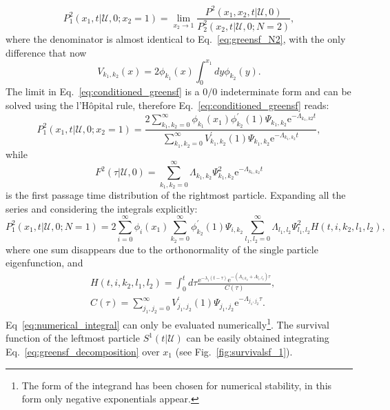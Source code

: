 \documentclass[a4paper,11pt]{amsart}
\theoremstyle{remark}
\newcommand{\ee}[1]{\mathrm{e}^{#1}}
\begin{document}
 \begin{equation}
   \label{eq:conditioned_greensf}
   P_1^2(x_1,t|\mathcal{U},0;x_2=1)=\lim_{x_2\to1}\frac{P^2(x_1,x_2,t|\mathcal{U},0)}{P^2_2(x_2,t|\mathcal{U},0;N=2)},
 \end{equation}
 where the denominator is almost identical to Eq.~\eqref{eq:greensf_N2}, with the only difference that now~\cite{lapolla_bethesf_2020}
 \begin{equation*}
   V_{k_1,k_2}(x)=2\phi_{k_1}(x)\int_{0}^{x_1} dy \phi_{k_2}(y).
 \end{equation*}
 The limit in Eq.~\eqref{eq:conditioned_greensf} is a $0/0$ indeterminate form and can be solved using the l'H\^opital rule, therefore Eq.~\eqref{eq:conditioned_greensf} reads:
 \begin{equation}
   P_1^2(x_1,t|\mathcal{U},0;x_2=1)=\frac{2\sum_{k_1,k_2=0}^\infty\phi_{k_1}(x_1)\phi^\prime_{k_2}(1)\Psi_{k_1,k_2}\ee{-\Lambda_{k_1,k2}t}}{\sum_{k_1,k_2=0}^\infty V^\prime_{k_1,k_2}(1)\Psi_{k_1,k_2}\ee{-\Lambda_{k_1,k_2}t}},
 \end{equation}
 while~\cite{lapolla_first_2022}
 \begin{equation}
   F^2(\tau|\mathcal{U},0)=\sum_{k_1,k_2=0}^\infty \Lambda_{k_1,k_2}\Psi_{k_1,k_2}^2\ee{-\Lambda_{k_1,k_2}t}
 \end{equation}
 is the first passage time distribution of the rightmost particle. Expanding all the series and considering the integrals explicitly:
 \begin{equation}
   \label{eq:greensf_N1_2}
   P^2_1(x_1,t|\mathcal{U},0; N=1)=2\sum_{i=0}^\infty\phi_i(x_1)\sum_{k_2=0}^\infty\phi^\prime_{k_2}(1)\Psi_{i,k_2}\sum_{l_1,l_2=0}^\infty \Lambda_{l_1,l_2}\Psi_{l_1,l_2}^2 H(t,i,k_2,l_1,l_2),
 \end{equation}
 where one sum disappears due to the orthonormality of the single particle eigenfunction, and
 \begin{align}
   \label{eq:numerical_integral}
   &H(t,i,k_2,l_1,l_2)=\int_0^t d\tau \frac{\ee{-\lambda_i(t-\tau)}\ee{-(\Lambda_{i,k_2}+\Lambda_{l_1,l_2})\tau}}{C(\tau)},\\
   &C(\tau)=\sum_{j_1,j_2=0}^\infty V^\prime_{j_1,j_2}(1)\Psi_{j_1,j_2}\ee{-\Lambda_{j_1,j_2}\tau}.
 \end{align}
 Eq~\eqref{eq:numerical_integral} can only be evaluated numerically\footnote{The form of the integrand has been chosen for numerical stability, in this form only negative exponentials appear.}. The survival function of the leftmost particle $S^1(t|\mathcal{U})$ can be easily obtained integrating Eq.~\eqref{eq:greensf_decomposition} over $x_1$ (see Fig.~\ref{fig:survivalsf_1}).
\end{document}
